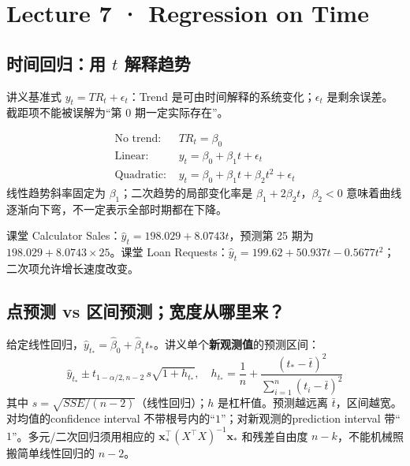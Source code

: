 \documentclass[UTF8,fontset=fandol,10.5pt,a4paper]{ctexart}
\newcommand{\eng}[1]{{\sffamily\color{navy}#1}}
\newcommand{\formula}[1]{\[\boxed{#1}\]}
\begin{document}
\section{Lecture 7 · Regression on Time}
\subsection{时间回归：用 $t$ 解释趋势}
讲义基准式 $y_t=TR_t+\epsilon_t$：\eng{Trend} 是可由时间解释的系统变化；$\epsilon_t$ 是剩余误差。截距项不能被误解为“第 0 期一定实际存在”。
\begin{keybox}
\begin{align*}
\text{No trend: }& TR_t=\beta_0\\
\text{Linear: }&y_t=\beta_0+\beta_1t+\epsilon_t\\
\text{Quadratic: }&y_t=\beta_0+\beta_1t+\beta_2t^2+\epsilon_t
\end{align*}
线性趋势斜率固定为 $\beta_1$；二次趋势的局部变化率是 $\beta_1+2\beta_2t$，$\beta_2<0$ 意味着曲线逐渐向下弯，不一定表示全部时期都在下降。
\end{keybox}
课堂 \eng{Calculator Sales}：$\hat y_t=198.029+8.0743t$，预测第 25 期为 $198.029+8.0743\times25$。课堂 \eng{Loan Requests}：$\hat y_t=199.62+50.937t-0.5677t^2$；二次项允许增长速度改变。
\par\smallskip{}\par\smallskip
\subsection{点预测 vs 区间预测；宽度从哪里来？}
给定线性回归，$\hat y_{t_*}=\hat\beta_0+\hat\beta_1t_*$。讲义单个\textbf{新观测值}的预测区间：
\formula{\hat y_{t_*}\pm t_{1-\alpha/2,n-2}\,s\sqrt{1+h_{t_*}},\quad h_{t_*}=\frac1n+\frac{(t_*-\bar t)^2}{\sum_{i=1}^{n}(t_i-\bar t)^2}}
其中 $s=\sqrt{SSE/(n-2)}$（线性回归）；$h$ 是杠杆值。预测越远离 $\bar t$，区间越宽。对均值的\eng{confidence interval} 不带根号内的“$1$”；对新观测的\eng{prediction interval} 带“$1$”。多元/二次回归须用相应的 $\mathbf x_*^\top(X^\top X)^{-1}\mathbf x_*$ 和残差自由度 $n-k$，不能机械照搬简单线性回归的 $n-2$。
\par\smallskip{}\par\smallskip
\end{document}
